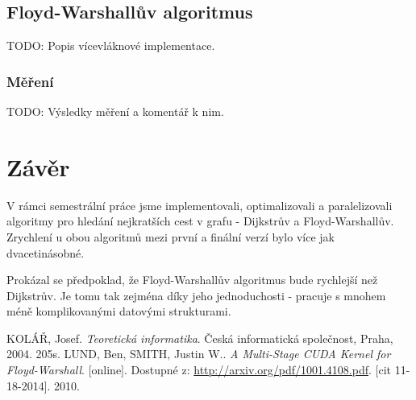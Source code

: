 \documentclass[a4paper,11pt]{article}
\begin{document}
\subsection{Floyd-Warshallův algoritmus}
TODO: Popis vícevláknové implementace.
\subsubsection{Měření}
TODO: Výsledky měření a komentář k nim.

\newpage

\section{Závěr}
V rámci semestrální práce jsme implementovali, optimalizovali a paralelizovali algoritmy pro hledání nejkratších cest v grafu - Dijkstrův a Floyd-Warshallův. Zrychlení u obou algoritmů mezi první a finální verzí bylo více jak dvacetinásobné.
\par
Prokázal se předpoklad, že Floyd-Warshallův algoritmus bude rychlejší než Dijkstrův. Je tomu tak zejména díky jeho jednoduchosti - pracuje s mnohem méně komplikovanými datovými strukturami.


\newpage
\begin{thebibliography}{1}
   KOLÁŘ, Josef.
    \emph{Teoretická informatika}.
    Česká informatická společnost, Praha, 2004. 205s.
   LUND, Ben, SMITH, Justin W..
    \emph{A Multi-Stage CUDA Kernel for Floyd-Warshall}.
    [online]. Dostupné z: \url{http://arxiv.org/pdf/1001.4108.pdf}. [cit 11-18-2014]. 2010.
\end{thebibliography}
\end{document}
